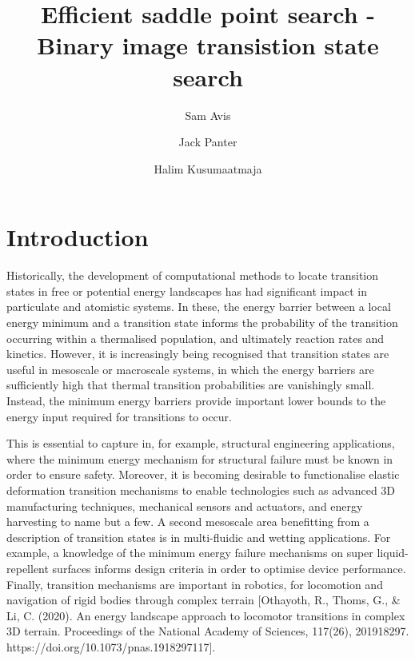 \documentclass[aps,twocolumn]{revtex4}
\begin{document}
\title{Efficient saddle point search - Binary image transistion state search}
\author{Sam Avis}
\author{Jack Panter}
\author{Halim Kusumaatmaja}

\begin{abstract}
\lipsum[1]
\end{abstract}

\maketitle


\section{Introduction}
Historically, the development of computational methods to locate transition states in free or potential energy landscapes has had significant impact in particulate and atomistic systems. In these, the energy barrier between a local energy minimum and a transition state informs the probability of the transition occurring within a thermalised population, and ultimately reaction rates and kinetics. However, it is increasingly being recognised that transition states are useful in mesoscale or macroscale systems, in which the energy barriers are sufficiently high that thermal transition probabilities are vanishingly small. Instead, the minimum energy barriers provide important lower bounds to the energy input required for transitions to occur.

This is essential to capture in, for example, structural engineering applications, where the minimum energy mechanism for structural failure must be known in order to ensure safety. Moreover, it is becoming desirable to functionalise elastic deformation transition mechanisms to enable technologies such as advanced 3D manufacturing techniques, mechanical sensors and actuators, and energy harvesting to name but a few. A second mesoscale area benefitting from a description of transition states is in multi-fluidic and wetting applications. For example, a knowledge of the minimum energy failure mechanisms on super liquid-repellent surfaces informs design criteria in order to optimise device performance. Finally, transition mechanisms are important in robotics, for locomotion and navigation of rigid bodies through complex terrain [Othayoth, R., Thoms, G., \& Li, C. (2020). An energy landscape approach to locomotor transitions in complex 3D terrain. Proceedings of the National Academy of Sciences, 117(26), 201918297. https://doi.org/10.1073/pnas.1918297117].
\end{document}
